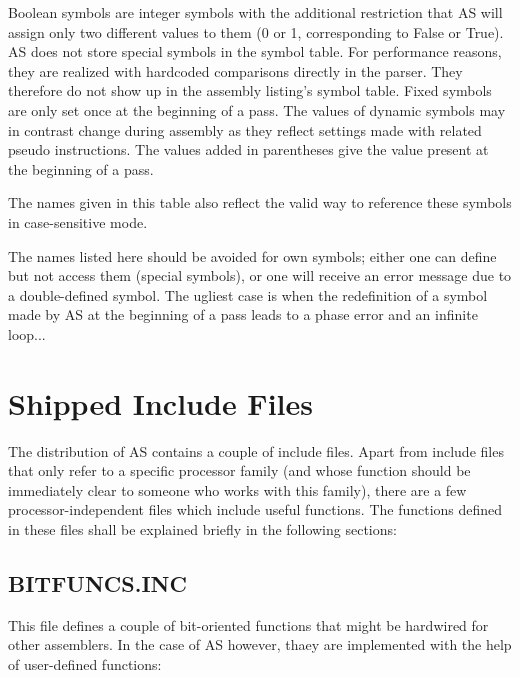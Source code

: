 \documentclass[12pt,twoside]{report}
\newcommand{\asname}{{AS}}
\begin{document}
Boolean symbols are integer symbols with the additional restriction that
\asname{} will assign only two different values to them (0 or 1,
corresponding to False or True).  \asname{} does not store special symbols
in the symbol table.  For performance reasons, they are realized with
hardcoded comparisons directly in the parser.  They therefore do not
show up in the assembly listing's symbol table.  Fixed symbols
are only set once at the beginning of a pass.  The values of dynamic
symbols may in contrast change during assembly as they reflect
settings made with related pseudo instructions.  The values added in
parentheses give the value present at the beginning of a pass.

The names given in this table also reflect the valid way to reference
these symbols in case-sensitive mode.

The names listed here should be avoided for own symbols; either one
can define but not access them (special symbols), or one will receive
an error message due to a double-defined symbol.  The ugliest case is
when the redefinition of a symbol made by \asname{} at the beginning of a
pass leads to a phase error and an infinite loop...


\cleardoublepage
\chapter{Shipped Include Files}

The distribution of \asname{} contains a couple of include files.  Apart from
include files that only refer to a specific processor family (and whose
function should be immediately clear to someone who works with this
family), there are a few processor-independent files which include useful
functions.  The functions defined in these files shall be explained
briefly in the following sections:

\section{BITFUNCS.INC}

This file defines a couple of bit-oriented functions that might be
hardwired for other assemblers.  In the case of \asname{} however, thaey are
implemented with the help of user-defined functions:
\end{document}

